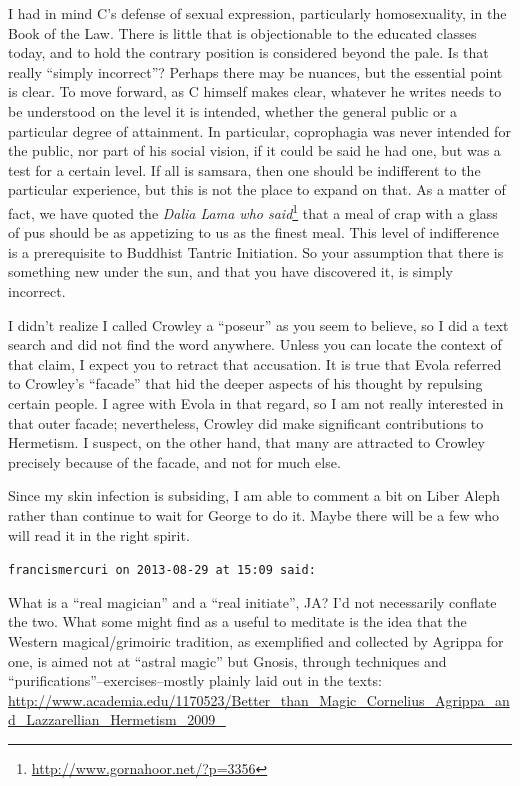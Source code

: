 \begin{footnotesize}
\begin{sffamily}
I had in mind C's defense of sexual expression, particularly homosexuality, in the Book of the Law. There is little that is objectionable to the educated classes today, and to hold the contrary position is considered beyond the pale. Is that really ``simply incorrect''? Perhaps there may be nuances, but the essential point is clear. To move forward, as C himself makes clear, whatever he writes needs to be understood on the level it is intended, whether the general public or a particular degree of attainment. In particular, coprophagia was never intended for the public, nor part of his social vision, if it could be said he had one, but was a test for a certain level. If all is samsara, then one should be indifferent to the particular experience, but this is not the place to expand on that. As a matter of fact, we have quoted the \textit{Dalia Lama who said}\footnote{\url{http://www.gornahoor.net/?p=3356}} that a meal of crap with a glass of pus should be as appetizing to us as the finest meal. This level of indifference is a prerequisite to Buddhist Tantric Initiation. So your assumption that there is something new under the sun, and that you have discovered it, is simply incorrect.

I didn't realize I called Crowley a ``poseur'' as you seem to believe, so I did a text search and did not find the word anywhere. Unless you can locate the context of that claim, I expect you to retract that accusation. It is true that Evola referred to Crowley's ``facade'' that hid the deeper aspects of his thought by repulsing certain people. I agree with Evola in that regard, so I am not really interested in that outer facade; nevertheless, Crowley did make significant contributions to Hermetism. I suspect, on the other hand, that many are attracted to Crowley precisely because of the facade, and not for much else.

Since my skin infection is subsiding, I am able to comment a bit on Liber Aleph rather than continue to wait for George to do it. Maybe there will be a few who will read it in the right spirit.

\hfill

\texttt{francismercuri on 2013-08-29 at 15:09 said:}

What is a ``real magician'' and a ``real initiate'', JA? I'd not necessarily conflate the two. What some might find as a useful to meditate is the idea that the Western magical/grimoiric tradition, as exemplified and collected by Agrippa for one, is aimed not at ``astral magic'' but Gnosis, through techniques and ``purifications''--exercises--mostly plainly laid out in the texts:\\
\url{http://www.academia.edu/1170523/Better\_than\_Magic\_Cornelius\_Agrippa\_and\_Lazzarellian\_Hermetism\_2009\_}



\end{sffamily}
\end{footnotesize}
